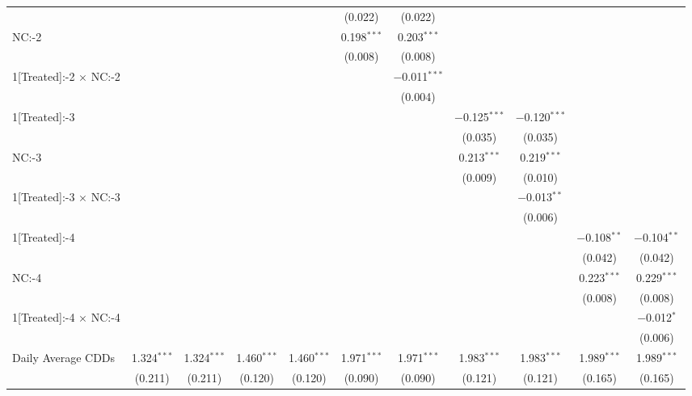 \begin{table}[!htbp]
\begin{adjustbox}{scale = 0.75}
\begin{tabular}{@{\extracolsep{5pt}}lcccccccccc}
  &  &  &  &  & (0.022) & (0.022) &  &  &  &  \\ 
 NC:-2 &  &  &  &  & 0.198$^{***}$ & 0.203$^{***}$ &  &  &  &  \\ 
  &  &  &  &  & (0.008) & (0.008) &  &  &  &  \\ 
 1[Treated]:-2 $\times$ NC:-2 &  &  &  &  &  & $-$0.011$^{***}$ &  &  &  &  \\ 
  &  &  &  &  &  & (0.004) &  &  &  &  \\ 
 1[Treated]:-3 &  &  &  &  &  &  & $-$0.125$^{***}$ & $-$0.120$^{***}$ &  &  \\ 
  &  &  &  &  &  &  & (0.035) & (0.035) &  &  \\ 
 NC:-3 &  &  &  &  &  &  & 0.213$^{***}$ & 0.219$^{***}$ &  &  \\ 
  &  &  &  &  &  &  & (0.009) & (0.010) &  &  \\ 
 1[Treated]:-3 $\times$ NC:-3 &  &  &  &  &  &  &  & $-$0.013$^{**}$ &  &  \\ 
  &  &  &  &  &  &  &  & (0.006) &  &  \\ 
 1[Treated]:-4 &  &  &  &  &  &  &  &  & $-$0.108$^{**}$ & $-$0.104$^{**}$ \\ 
  &  &  &  &  &  &  &  &  & (0.042) & (0.042) \\ 
 NC:-4 &  &  &  &  &  &  &  &  & 0.223$^{***}$ & 0.229$^{***}$ \\ 
  &  &  &  &  &  &  &  &  & (0.008) & (0.008) \\ 
 1[Treated]:-4 $\times$ NC:-4 &  &  &  &  &  &  &  &  &  & $-$0.012$^{*}$ \\ 
  &  &  &  &  &  &  &  &  &  & (0.006) \\ 
 Daily Average CDDs & 1.324$^{***}$ & 1.324$^{***}$ & 1.460$^{***}$ & 1.460$^{***}$ & 1.971$^{***}$ & 1.971$^{***}$ & 1.983$^{***}$ & 1.983$^{***}$ & 1.989$^{***}$ & 1.989$^{***}$ \\ 
  & (0.211) & (0.211) & (0.120) & (0.120) & (0.090) & (0.090) & (0.121) & (0.121) & (0.165) & (0.165) \\ 

\end{tabular}
\end{adjustbox}
\end{table}
